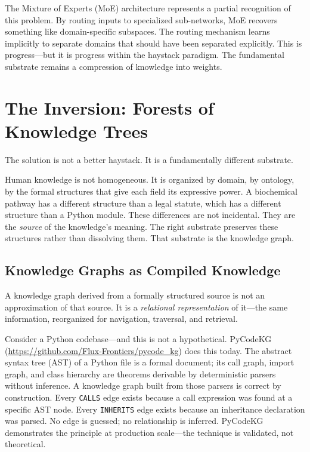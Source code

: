 \documentclass{article}
\begin{document}
The Mixture of Experts (MoE) architecture \cite{shazeer2017moe} represents a
partial recognition of this problem.  By routing inputs to specialized
sub-networks, MoE recovers something like domain-specific subspaces.  The
routing mechanism learns implicitly to separate domains that should have been
separated explicitly.  This is progress---but it is progress within the haystack
paradigm.  The fundamental substrate remains a compression of knowledge into
weights.

\section{The Inversion: Forests of Knowledge Trees}

The solution is not a better haystack.  It is a fundamentally different
substrate.

Human knowledge is not homogeneous.  It is organized by domain, by ontology, by
the formal structures that give each field its expressive power.  A biochemical
pathway has a different structure than a legal statute, which has a different
structure than a Python module.  These differences are not incidental.  They are
the \emph{source} of the knowledge's meaning.  The right substrate preserves
these structures rather than dissolving them.  That substrate is the knowledge
graph.

\subsection{Knowledge Graphs as Compiled Knowledge}

A knowledge graph derived from a formally structured source is not an
approximation of that source.  It is a \emph{relational representation} of
it---the same information, reorganized for navigation, traversal, and retrieval.

Consider a Python codebase---and this is not a hypothetical.  PyCodeKG
(\url{https://github.com/Flux-Frontiers/pycode\_kg}) does this today.  The
abstract syntax tree (AST) of a Python file is a formal document; its call
graph, import graph, and class hierarchy are theorems derivable by deterministic
parsers without inference.  A knowledge graph built from those parsers is correct
by construction.  Every \texttt{CALLS} edge exists because a call expression was
found at a specific AST node.  Every \texttt{INHERITS} edge exists because an
inheritance declaration was parsed.  No edge is guessed; no relationship is
inferred.  PyCodeKG demonstrates the principle at production scale---the
technique is validated, not theoretical.
\end{document}
